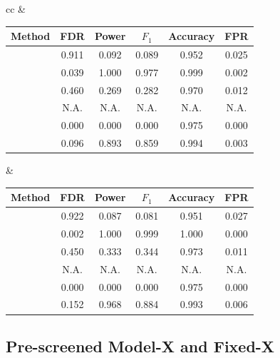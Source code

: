 ﻿\documentclass[12pt]{article}
\newcommand{\0}{\mbox{\bf 0}}
\theoremstyle{plain}%
\theoremstyle{definition}
\begin{document}
{\begin{table}[htbp]
\begin{tabular}{cc}
 &  \\
\begin{tabular}{lccccc}
\toprule
Method & FDR & Power & $F_1$ & Accuracy & FPR \\
\midrule
\sc{Lasso}         &     0.911  & 0.092  & 0.089  & 0.952  & 0.025  \\
\sc{FarmSelect}    &    0.039  & 1.000  & 0.977  & 0.999  & 0.002  \\
\sc{Model-X}       &    0.460  & 0.269  & 0.282  & 0.970  & 0.012  \\
\sc{Fixed-X}       & N.A.  & N.A.  & N.A.  & N.A.  & N.A.  \\
\sc{TSKI }         &     0.000  & 0.000  & 0.000  & 0.975  & 0.000  \\
\sc{FAR-Knockoff} & 0.096 & 0.893 & 0.859 & 0.994 & 0.003 \\

\bottomrule
\end{tabular}
&
\begin{tabular}{lccccc}
\toprule
Method & FDR & Power & $F_1$ & Accuracy & FPR \\
\midrule
\sc{Lasso}         &    0.922  & 0.087  & 0.081  & 0.951  & 0.027  \\
\sc{FarmSelect}    &    0.002  & 1.000  & 0.999  & 1.000  & 0.000  \\
\sc{Model-X}       &    0.450  & 0.333  & 0.344  & 0.973  & 0.011  \\
\sc{Fixed-X}       & N.A.  & N.A.  & N.A.  & N.A.  & N.A.  \\
\sc{TSKI}          &    0.000  & 0.000  & 0.000  & 0.975  & 0.000  \\
\sc{FAR-Knockoff} & 0.152 & 0.968 & 0.884 & 0.993 & 0.006 \\

\bottomrule
\end{tabular}
\end{tabular}
\end{table}

{\color{red}
{\color{minorrevisionred}}


}

\subsection{Pre-screened Model-X and Fixed-X}\label{sec:pre_screening}

}
\end{document}
